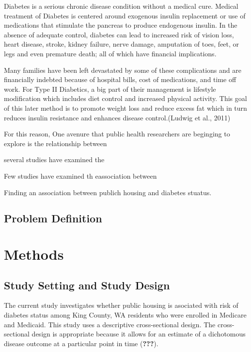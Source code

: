 \documentclass [11pt, proquest] {uwthesis}[2015/03/03]
\begin{document}
Diabetes is a serious chronic disease condition without a medical cure.
Medical treatment of Diabetes is centered around exogenous insulin
replacement or use of medications that stimulate the pancreas to produce
endogenous insulin. In the absence of adequate control, diabetes can
lead to increased risk of vision loss, heart disease, stroke, kidney
failure, nerve damage, amputation of toes, feet, or legs and even
premature death; all of which have financial implications.

Many families have been left devastated by some of these complications
and are financially indebted because of hospital bills, cost of
medications, and time off work. For Type II Diabetics, a big part of
their management is lifestyle modification which includes diet control
and increased physical activity. This goal of this later method is to
promote weight loss and reduce excess fat which in turn reduces insulin
resistance and enhances disease control.(Ludwig et al., 2011)

For this reason, One avenure that public health researchers are
beginging to explore is the relationship between

several studies have examined the

Few studies have examined th eassociation between

Finding an association between publich housing and diabetes stuatus.

\section{Problem Definition}\label{problem-definition}

\chapter{Methods}\label{math-sci}

\section{Study Setting and Study
Design}\label{study-setting-and-study-design}

The current study investigates whether public housing is asociated with
risk of diabetes status among King County, WA residents who were
enrolled in Medicare and Medicaid. This study uses a descriptive
cross-sectional design. The cross-sectional design is appropriate
because it allows for an estimate of a dichotomous disease outcome at a
particular point in time ({\textbf{???}}).
\end{document}
